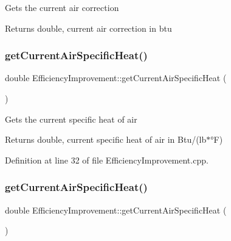 Gets the current air correction

\begin{DoxyReturn}{Returns}
double, current air correction in btu 
\end{DoxyReturn}
\mbox{\label{class_efficiency_improvement_a0d8b0d8968802a7994784380be376dfb}} 
\subsubsection{\texorpdfstring{get\+Current\+Air\+Specific\+Heat()}{getCurrentAirSpecificHeat()}\hspace{0.1cm}{\footnotesize\ttfamily [1/3]}}
{\footnotesize\ttfamily double Efficiency\+Improvement\+::get\+Current\+Air\+Specific\+Heat (\begin{DoxyParamCaption}{ }\end{DoxyParamCaption})}

Gets the current specific heat of air

\begin{DoxyReturn}{Returns}
double, current specific heat of air in Btu/(lb$\ast$°F) 
\end{DoxyReturn}


Definition at line 32 of file Efficiency\+Improvement.\+cpp.

\mbox{\label{class_efficiency_improvement_a0d8b0d8968802a7994784380be376dfb}} 
\subsubsection{\texorpdfstring{get\+Current\+Air\+Specific\+Heat()}{getCurrentAirSpecificHeat()}\hspace{0.1cm}{\footnotesize\ttfamily [2/3]}}
{\footnotesize\ttfamily double Efficiency\+Improvement\+::get\+Current\+Air\+Specific\+Heat (\begin{DoxyParamCaption}{ }\end{DoxyParamCaption})}

